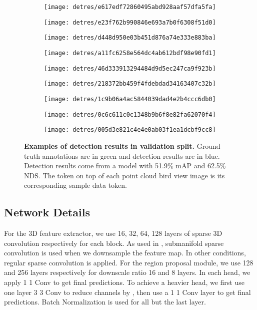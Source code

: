 \documentclass[10pt,twocolumn,letterpaper]{article}
\begin{document}
\begin{figure*}[t]
\centering
\begin{subfigure}[b]{.33\linewidth}
\texttt{[image: detres/e617edf72860495abd928aaf57dfa5fa]}
\end{subfigure}
\begin{subfigure}[b]{.33\linewidth}
\texttt{[image: detres/e23f762b990846e693a7b0f6308f51d0]}
\end{subfigure}
\begin{subfigure}[b]{.33\linewidth}
\texttt{[image: detres/d448d950e03b451d876a74e333e883ba]}
\end{subfigure}
\begin{subfigure}[b]{.33\linewidth}
\texttt{[image: detres/a11fc6258e564dc4ab612bdf98e90fd1]}
\end{subfigure}
\begin{subfigure}[b]{.33\linewidth}
\texttt{[image: detres/46d333913294484d9d5ec247ca9f923b]}
\end{subfigure}
\begin{subfigure}[b]{.33\linewidth}
\texttt{[image: detres/218372bb459f4fdebdad34163407c32b]}
\end{subfigure}
\begin{subfigure}[b]{.33\linewidth}
\texttt{[image: detres/1c9b06a4ac5844039dad4e2b4ccc6db0]}
\end{subfigure}
\begin{subfigure}[b]{.33\linewidth}
\texttt{[image: detres/0c6c611c0c1348b9b6f8e82fa62070f4]}
\end{subfigure}
\begin{subfigure}[b]{.33\linewidth}
\texttt{[image: detres/005d3e821c4e4e0ab03f1ea1dcbf9cc8]}
\end{subfigure}
\caption{\textbf{Examples of detection results in validation split.} Ground truth annotations are in green and detection results are in blue. Detection results come from a model with 51.9\% mAP and 62.5\% NDS. The token on top of each point cloud bird view image is its corresponding sample data token.}
\label{fig:examplesbev}
\end{figure*}


\subsection{Network Details}

For the 3D feature extractor, we use 16, 32, 64, 128 layers of sparse 3D convolution respectively for each block. As used in \cite{DBLP:journals/corr/GrahamM17}, submanifold sparse convolution is used when we downsample the feature map. In other conditions, regular sparse convolution is applied. For the region proposal module, we use 128 and 256 layers respectively for downscale ratio 16 and 8 layers. In each head, we apply 1  1 Conv to get final predictions. To achieve a heavier head, we first use one layer 3  3 Conv to reduce channels by , then use a 1  1 Conv layer to get final predictions. Batch Normalization \cite{DBLP:journals/corr/IoffeS15} is used for all but the last layer.
\end{document}
